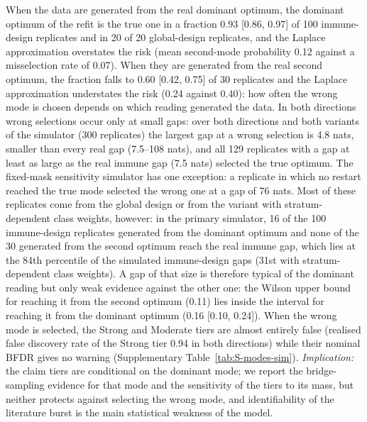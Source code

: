 \documentclass[11pt,a4paper]{article}
\begin{document}
When the data are generated from the real dominant optimum, the dominant optimum of the refit is the true one in a fraction 0.93 [0.86, 0.97] of 100 immune-design replicates and in 20 of 20 global-design replicates, and the Laplace approximation overstates the risk (mean second-mode probability 0.12 against a misselection rate of 0.07).
When they are generated from the real second optimum, the fraction falls to 0.60 [0.42, 0.75] of 30 replicates and the Laplace approximation understates the risk (0.24 against 0.40): how often the wrong mode is chosen depends on which reading generated the data.
In both directions wrong selections occur only at small gaps: over both directions and both variants of the simulator (300 replicates) the largest gap at a wrong selection is 4.8 nats, smaller than every real gap (7.5--108 nats), and all 129 replicates with a gap at least as large as the real immune gap (7.5 nats) selected the true optimum. The fixed-mask sensitivity simulator has one exception: a replicate in which no restart reached the true mode selected the wrong one at a gap of 76 nats.
Most of these replicates come from the global design or from the variant with stratum-dependent class weights, however: in the primary simulator, 16 of the 100 immune-design replicates generated from the dominant optimum and none of the 30 generated from the second optimum reach the real immune gap, which lies at the 84th percentile of the simulated immune-design gaps (31st with stratum-dependent class weights).
A gap of that size is therefore typical of the dominant reading but only weak evidence against the other one: the Wilson upper bound for reaching it from the second optimum (0.11) lies inside the interval for reaching it from the dominant optimum (0.16 [0.10, 0.24]).
When the wrong mode is selected, the Strong and Moderate tiers are almost entirely false (realised false discovery rate of the Strong tier 0.94 in both directions) while their nominal BFDR gives no warning (Supplementary Table~\ref{tab:S-modes-sim}).
\emph{Implication:} the claim tiers are conditional on the dominant mode; we report the bridge-sampling evidence for that mode and the sensitivity of the tiers to its mass, but neither protects against selecting the wrong mode, and identifiability of the literature burst is the main statistical weakness of the model.
\end{document}
